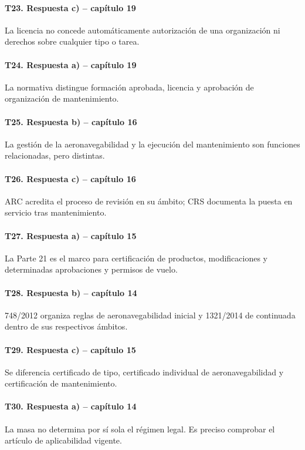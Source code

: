 \paragraph{T23. Respuesta c) -- capítulo 19} La licencia no concede automáticamente autorización de una organización ni derechos sobre cualquier tipo o tarea.

\paragraph{T24. Respuesta a) -- capítulo 19} La normativa distingue formación aprobada, licencia y aprobación de organización de mantenimiento.

\paragraph{T25. Respuesta b) -- capítulo 16} La gestión de la aeronavegabilidad y la ejecución del mantenimiento son funciones relacionadas, pero distintas.

\paragraph{T26. Respuesta c) -- capítulo 16} ARC acredita el proceso de revisión en su ámbito; CRS documenta la puesta en servicio tras mantenimiento.

\paragraph{T27. Respuesta a) -- capítulo 15} La Parte 21 es el marco para certificación de productos, modificaciones y determinadas aprobaciones y permisos de vuelo.

\paragraph{T28. Respuesta b) -- capítulo 14} 748/2012 organiza reglas de aeronavegabilidad inicial y 1321/2014 de continuada dentro de sus respectivos ámbitos.

\paragraph{T29. Respuesta c) -- capítulo 15} Se diferencia certificado de tipo, certificado individual de aeronavegabilidad y certificación de mantenimiento.

\paragraph{T30. Respuesta a) -- capítulo 14} La masa no determina por sí sola el régimen legal. Es preciso comprobar el artículo de aplicabilidad vigente.

